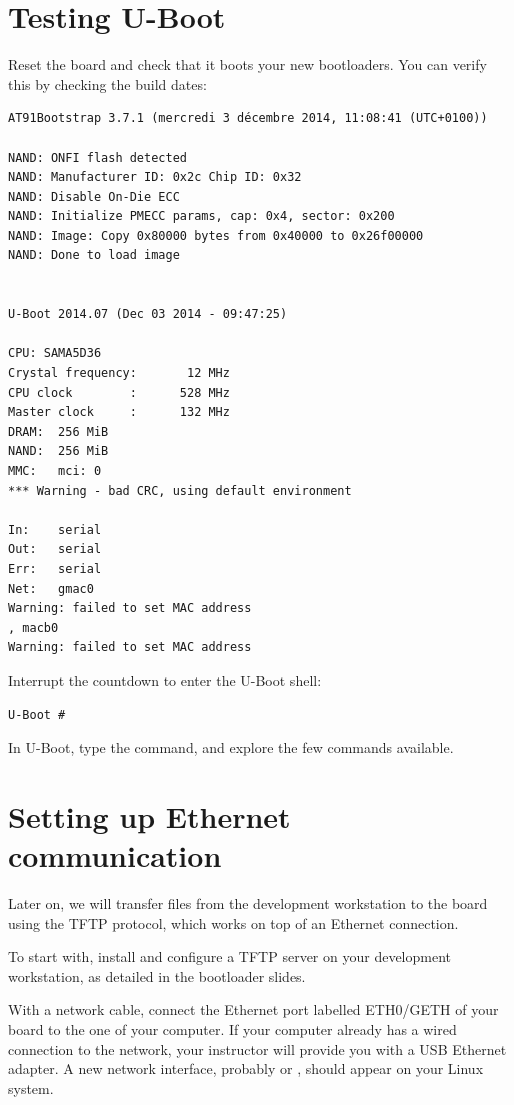 \section{Testing U-Boot}

Reset the board and check that it boots your new bootloaders. You can
verify this by checking the build dates:

\begin{verbatim}
AT91Bootstrap 3.7.1 (mercredi 3 décembre 2014, 11:08:41 (UTC+0100))

NAND: ONFI flash detected
NAND: Manufacturer ID: 0x2c Chip ID: 0x32
NAND: Disable On-Die ECC
NAND: Initialize PMECC params, cap: 0x4, sector: 0x200
NAND: Image: Copy 0x80000 bytes from 0x40000 to 0x26f00000
NAND: Done to load image


U-Boot 2014.07 (Dec 03 2014 - 09:47:25)

CPU: SAMA5D36
Crystal frequency:       12 MHz
CPU clock        :      528 MHz
Master clock     :      132 MHz
DRAM:  256 MiB
NAND:  256 MiB
MMC:   mci: 0
*** Warning - bad CRC, using default environment

In:    serial
Out:   serial
Err:   serial
Net:   gmac0
Warning: failed to set MAC address
, macb0
Warning: failed to set MAC address
\end{verbatim}

Interrupt the countdown to enter the U-Boot shell:
\begin{verbatim}
U-Boot #
\end{verbatim}

In U-Boot, type the  command, and explore the few commands
available.

\section{Setting up Ethernet communication}

Later on, we will transfer files from the development workstation to
the board using the TFTP protocol, which works on top of an Ethernet
connection.

To start with, install and configure a TFTP server on your development
workstation, as detailed in the bootloader slides.

With a network cable, connect the Ethernet port labelled ETH0/GETH of
your board to the one of your computer. If your computer already has a
wired connection to the network, your instructor will provide you with
a USB Ethernet adapter. A new network interface, probably 
or , should appear on your Linux system.

